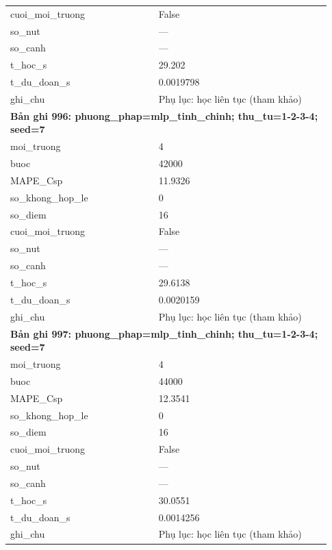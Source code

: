 \begin{longtable}{p{0.43\linewidth}p{0.50\linewidth}}
cuoi\_\allowbreak moi\_\allowbreak truong & False \\
so\_\allowbreak nut & — \\
so\_\allowbreak canh & — \\
t\_\allowbreak hoc\_\allowbreak s & 29.202 \\
t\_\allowbreak du\_\allowbreak doan\_\allowbreak s & 0.0019798 \\
ghi\_\allowbreak chu & Phụ lục: học liên tục (tham khảo) \\
\midrule
\multicolumn{2}{p{0.95\linewidth}}{\textbf{Bản ghi 996: phuong\_phap=mlp\_tinh\_chinh; thu\_tu=1-2-3-4; seed=7}} \\
moi\_\allowbreak truong & 4 \\
buoc & 42000 \\
MAPE\_\allowbreak Csp & 11.9326 \\
so\_\allowbreak khong\_\allowbreak hop\_\allowbreak le & 0 \\
so\_\allowbreak diem & 16 \\
cuoi\_\allowbreak moi\_\allowbreak truong & False \\
so\_\allowbreak nut & — \\
so\_\allowbreak canh & — \\
t\_\allowbreak hoc\_\allowbreak s & 29.6138 \\
t\_\allowbreak du\_\allowbreak doan\_\allowbreak s & 0.0020159 \\
ghi\_\allowbreak chu & Phụ lục: học liên tục (tham khảo) \\
\midrule
\multicolumn{2}{p{0.95\linewidth}}{\textbf{Bản ghi 997: phuong\_phap=mlp\_tinh\_chinh; thu\_tu=1-2-3-4; seed=7}} \\
moi\_\allowbreak truong & 4 \\
buoc & 44000 \\
MAPE\_\allowbreak Csp & 12.3541 \\
so\_\allowbreak khong\_\allowbreak hop\_\allowbreak le & 0 \\
so\_\allowbreak diem & 16 \\
cuoi\_\allowbreak moi\_\allowbreak truong & False \\
so\_\allowbreak nut & — \\
so\_\allowbreak canh & — \\
t\_\allowbreak hoc\_\allowbreak s & 30.0551 \\
t\_\allowbreak du\_\allowbreak doan\_\allowbreak s & 0.0014256 \\
ghi\_\allowbreak chu & Phụ lục: học liên tục (tham khảo) \\

\end{longtable}
